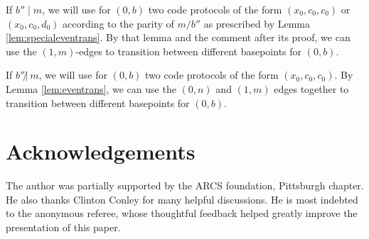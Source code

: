 \documentclass[12pt]{article}
\newcommand{\0}{\varnothing}
\begin{document}
If $b'' \mid m$, we will use for $(0,b)$ two code protocols of the form $(x_0,c_0,c_0)$ or $(x_0,c_0,d_0)$ according to the parity of $m/b''$ as prescribed by Lemma \ref{lem:specialeventrans}. By that lemma and the comment after its proof, we can use the $(1,m)$-edges to transition between different basepoints for $(0,b)$.

If $b'' \not|\ m$, we will use for $(0,b)$ two code protocols of the form $(x_0,c_0,c_0)$. By Lemma \ref{lem:eventrans}, we can use the $(0,n)$ and $(1,m)$ edges together to transition between different basepoints for $(0,b)$.

\section*{Acknowledgements}

The author was partially supported by the ARCS foundation, Pittsburgh chapter. He also thanks Clinton Conley for many helpful discussions. He is most indebted to the anonymous referee, whose thoughtful feedback helped greatly improve the presentation of this paper. 
\end{document}
